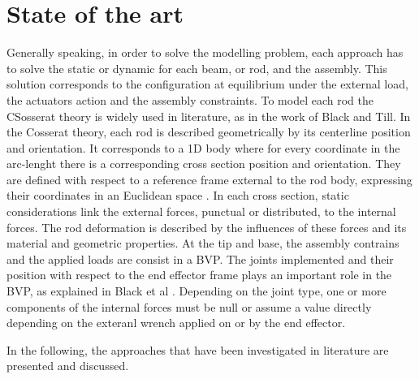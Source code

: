 \documentclass{thesisreport}
\begin{document}
 \chapter{State of the art}
 Generally speaking, in order to solve the modelling problem, each approach has to solve the static or dynamic for each beam, or rod, and the assembly. This solution corresponds to the configuration at equilibrium under the external load, the actuators action and the assembly constraints. To model each rod the CSosserat theory is widely used in literature, as in the work of Black\cite{black_parallel_2018}\cite{black_modeling_2017} and Till\cite{till_efficient_2015}\cite{till_real-time_2019}. In the Cosserat theory, each rod is described geometrically by its centerline position and orientation. It corresponds to a 1D body where for every coordinate in the arc-lenght there is a corresponding cross section position and orientation. They are defined with respect to a reference frame external to the rod body, expressing their coordinates in an Euclidean space \cite{selig_geometric_2005}. 
 In each cross section, static considerations link the external forces, punctual or distributed, to the internal forces. The rod deformation is described by the influences of these forces and its material and geometric properties. At the tip and base, the assembly contrains and the applied loads are consist in a BVP. The joints implemented and their position with respect to the end effector frame plays an important role in the BVP, as explained in Black et al \cite{black_parallel_2018}. Depending on the joint type, one or more components of the internal forces must be null or assume a value directly depending on the exteranl wrench applied on or by the end effector.  
 
 In the following, the approaches that have been investigated in literature are presented and discussed. 
 
\end{document}
